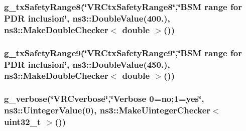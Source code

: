 \subsubsection[{\texorpdfstring{g\+\_\+tx\+Safety\+Range8}{g_txSafetyRange8}}]{ g\+\_\+tx\+Safety\+Range8(\char`\"{}V\+R\+Ctx\+Safety\+Range8\char`\"{},\char`\"{}B\+SM range for P\+DR inclusion\char`\"{}, ns3\+::\+Double\+Value(400.), {\bf ns3\+::\+Make\+Double\+Checker}$<$ double $>$())\hspace{0.3cm}{\ttfamily [static]}}\hypertarget{vanet-routing-compare_8cc_a920d83af661bf1ffdba301d10b2246fc}{}\label{vanet-routing-compare_8cc_a920d83af661bf1ffdba301d10b2246fc}
\subsubsection[{\texorpdfstring{g\+\_\+tx\+Safety\+Range9}{g_txSafetyRange9}}]{ g\+\_\+tx\+Safety\+Range9(\char`\"{}V\+R\+Ctx\+Safety\+Range9\char`\"{},\char`\"{}B\+SM range for P\+DR inclusion\char`\"{}, ns3\+::\+Double\+Value(450.), {\bf ns3\+::\+Make\+Double\+Checker}$<$ double $>$())\hspace{0.3cm}{\ttfamily [static]}}\hypertarget{vanet-routing-compare_8cc_a6478672cb0ee8121ed2a8aefb62626aa}{}\label{vanet-routing-compare_8cc_a6478672cb0ee8121ed2a8aefb62626aa}
\subsubsection[{\texorpdfstring{g\+\_\+verbose}{g_verbose}}]{ g\+\_\+verbose(\char`\"{}V\+R\+Cverbose\char`\"{},\char`\"{}Verbose 0=no;1=yes\char`\"{}, ns3\+::\+Uinteger\+Value(0), {\bf ns3\+::\+Make\+Uinteger\+Checker}$<$ uint32\+\_\+t $>$())\hspace{0.3cm}{\ttfamily [static]}}\hypertarget{vanet-routing-compare_8cc_a7e9e2d572f246b22c0207d722e616181}{}\label{vanet-routing-compare_8cc_a7e9e2d572f246b22c0207d722e616181}
